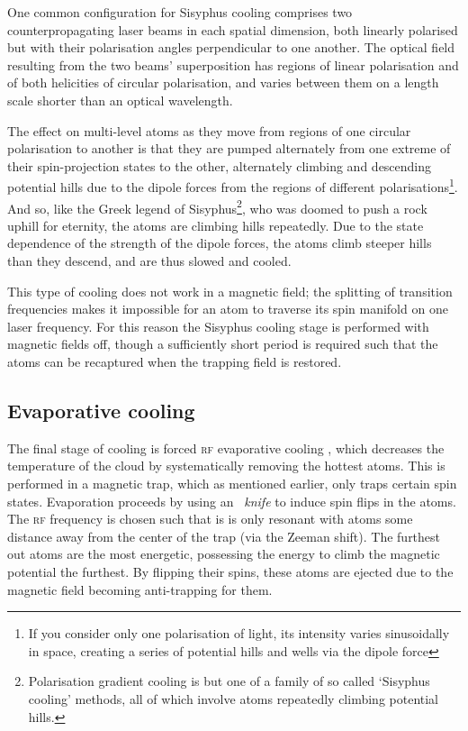One common configuration for Sisyphus cooling comprises two counterpropagating laser beams in each spatial dimension, both linearly polarised but with their polarisation angles perpendicular to one another. The optical field resulting from the two beams' superposition has regions of linear polarisation and of both helicities of circular polarisation, and varies between them on a length scale shorter than an optical wavelength.

The effect on multi-level atoms as they move from regions of one circular polarisation to another is that they are pumped alternately from one extreme of their spin-projection states to the other, alternately climbing and descending potential hills due to the dipole forces from the regions of different polarisations\footnote{If you consider only one polarisation of light, its intensity varies sinusoidally in space, creating a series of potential hills and wells via the dipole force}. And so, like the Greek legend of Sisyphus\footnote{Polarisation gradient cooling is but one of a family of so called `Sisyphus cooling' methods, all of which involve atoms repeatedly climbing potential hills.}, who was doomed to push a rock uphill for eternity, the atoms are climbing hills repeatedly. Due to the state dependence of the strength of the dipole forces, the atoms climb steeper hills than they descend, and are thus slowed and cooled.

This type of cooling does not work in a magnetic field; the splitting of transition frequencies makes it impossible for an atom to traverse its spin manifold on one laser frequency. For this reason the Sisyphus cooling stage is performed with magnetic fields off, though a sufficiently short period is required such that the atoms can be recaptured when the trapping field is restored.

\subsection{Evaporative cooling}\label{sec:evaporative_cooling}

The final stage of cooling is forced \textsc{rf} evaporative cooling \cite{hess_evaporative_1986, anderson_observation_1995}, which decreases the temperature of the cloud by systematically removing the hottest atoms. This is performed in a magnetic trap, which as mentioned earlier, only traps certain spin states. Evaporation proceeds by using an \emph{\rf\ knife} to induce spin flips in the atoms. The \textsc{rf} frequency is chosen such that is is only resonant with atoms some distance away from the center of the trap (via the Zeeman shift). The furthest out atoms are the most energetic, possessing the energy to climb the magnetic potential the furthest. By flipping their spins, these atoms are ejected due to the magnetic field becoming anti-trapping for them.

